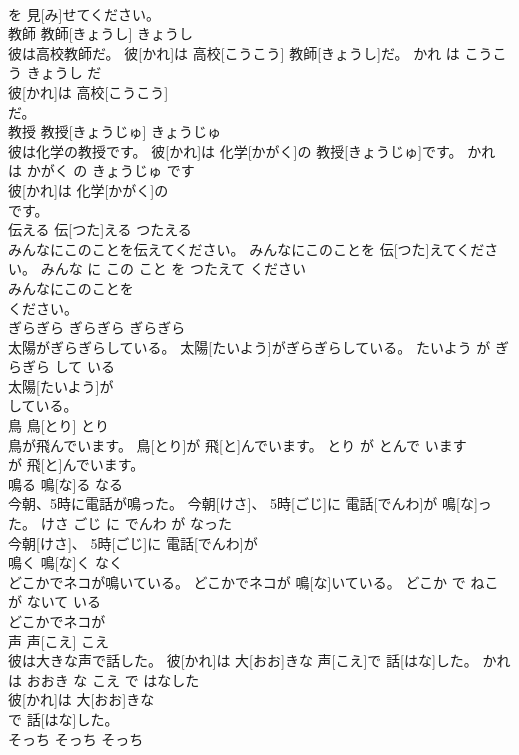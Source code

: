 \documentclass[8pt]{extreport}
\begin{document}
\begin{CJK}{UTF8}{min}
\\	を 見[み]せてください。		
\\	教師	教師[きょうし]	きょうし	
\\	彼は高校教師だ。	彼[かれ]は 高校[こうこう] 教師[きょうし]だ。	かれ は こうこう きょうし だ	
\\	彼[かれ]は 高校[こうこう]
\\	だ。		
\\	教授	教授[きょうじゅ]	きょうじゅ	
\\	彼は化学の教授です。	彼[かれ]は 化学[かがく]の 教授[きょうじゅ]です。	かれ は かがく の きょうじゅ です	
\\	彼[かれ]は 化学[かがく]の
\\	です。		
\\	伝える	伝[つた]える	つたえる	
\\	みんなにこのことを伝えてください。	みんなにこのことを 伝[つた]えてください。	みんな に この こと を つたえて ください	
\\	みんなにこのことを
\\	ください。		
\\	ぎらぎら	ぎらぎら	ぎらぎら	
\\	太陽がぎらぎらしている。	太陽[たいよう]がぎらぎらしている。	たいよう が ぎらぎら して いる	
\\	太陽[たいよう]が
\\	している。		
\\	鳥	鳥[とり]	とり	
\\	鳥が飛んでいます。	鳥[とり]が 飛[と]んでいます。	とり が とんで います	
\\	が 飛[と]んでいます。		
\\	鳴る	鳴[な]る	なる	
\\	今朝、5時に電話が鳴った。	今朝[けさ]、 5時[ごじ]に 電話[でんわ]が 鳴[な]った。	けさ ごじ に でんわ が なった	
\\	今朝[けさ]、 5時[ごじ]に 電話[でんわ]が
\\	鳴く	鳴[な]く	なく	
\\	どこかでネコが鳴いている。	どこかでネコが 鳴[な]いている。	どこか で ねこ が ないて いる	
\\	どこかでネコが
\\	声	声[こえ]	こえ	
\\	彼は大きな声で話した。	彼[かれ]は 大[おお]きな 声[こえ]で 話[はな]した。	かれ は おおき な こえ で はなした	
\\	彼[かれ]は 大[おお]きな
\\	で 話[はな]した。		
\\	そっち	そっち	そっち	

\end{CJK}
\end{document}

